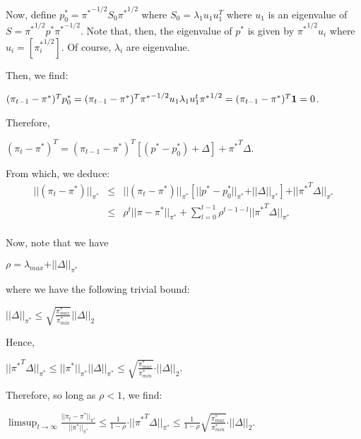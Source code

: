 \documentclass[letterpaper, 11pt, reqno]{amsart}
\begin{document}
	Now, define $p_0^* = {\pi^*}^{-1/2} S_0 {\pi^*}^{1/2}$ where $S_0 = \lambda_1 u_1 u_1^T$ where $u_1$ is an eigenvalue of $S = {\pi^*}^{1/2} p^* {\pi^*}^{-1/2}$. Note that, then, the eigenvalue of $p^*$ is given by ${\pi^*}^{1/2} u_i$ where $u_i = [{\pi_i^*}^{1/2}]$. Of course, $\lambda_i$ are eigenvalue.
	
	Then, we find:
		\begin{center}
			$(\pi_{t-1} - \pi^*)^T p_0^* = (\pi_{t-1} - \pi^*)^T {\pi^*}^{-1/2} u_1 \lambda_1 u_1^t {\pi^*}^{1/2} = (\pi_{t-1} - \pi^*)^T {\bf 1} = 0$.
		\end{center}
		
	Therefore,
		\begin{center}
			$(\pi_t - \pi^*)^T = (\pi_{t-1} - \pi^*)^T [(p^* - p_0^*) + \Delta] + {\pi^*}^T \Delta$.
		\end{center}
	
	From which, we deduce:
		\begin{eqnarray*}
			\vert\vert (\pi_t - \pi^*) \vert\vert_{\pi^*} &\leq& \vert\vert (\pi_t - \pi^*) \vert\vert_{\pi^*} [\vert\vert p^* - p_0^* \vert\vert_{\pi^*} + \vert\vert \Delta \vert\vert_{\pi^*}] + \vert\vert {\pi^*}^T \Delta \vert\vert_{\pi^*} \\
			&\leq& \rho^t \vert\vert \pi - \pi^* \vert\vert_{\pi^*} + \sum_{l=0}^{t-1} \rho^{t-1-l} \vert\vert {\pi^*}^T \Delta \vert\vert_{\pi^*} \\
		\end{eqnarray*}
	
	Now, note that we have
		\begin{center}
			$\rho = \lambda_{max} + \vert\vert \Delta \vert\vert_{\pi^*}$
		\end{center}
	where we have the following trivial bound:
		\begin{center}
			$\displaystyle \vert\vert \Delta \vert\vert_{\pi^*} \leq \sqrt{\frac{\pi_{max}^*}{\pi_{min}^*}} \vert\vert \Delta \vert\vert_2$
		\end{center}
	
	Hence,
		\begin{center}
			$\displaystyle \vert\vert {\pi^*}^T \Delta \vert\vert_{\pi^*} \leq \vert\vert \pi^* \vert\vert_{\pi^*} \vert\vert \Delta \vert\vert_{\pi^*} \leq \sqrt{\frac{\pi_{max}^*}{\pi_{min}^*}} \cdot \vert\vert \Delta \vert\vert_2$.
		\end{center}
	
	Therefore, so long as $\rho < 1$, we find:
		\begin{center}
			$\displaystyle \limsup_{t \rightarrow \infty} \frac{\vert\vert \pi_t - \pi^* \vert\vert_{\pi^*}}{\vert\vert \pi^* \vert\vert_{\pi^*}} \leq \frac{1}{1-\rho} \cdot \vert\vert {\pi^*}^T \Delta \vert\vert_{\pi^*} \leq \frac{1}{1-\rho} \sqrt{\frac{\pi_{max}^*}{\pi_{min}^*}} \cdot \vert\vert \Delta \vert\vert_2$.
		\end{center}
	
\end{document}
